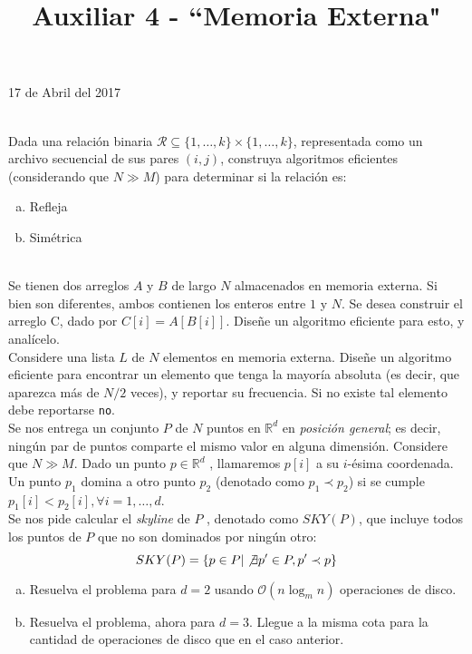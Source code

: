 \documentclass[dcc,uchile]{fcfmcourse}
\title{Auxiliar 4 - ``Memoria Externa"}
\begin{document}
\maketitle
\begin{center}
17 de Abril del 2017
\end{center}
\vspace{-1ex}


\begin{problems}
\\
Dada una relación binaria $\mathcal{R} \subseteq \{1, \ldots, k \} \times \{1, \ldots, k \}$, representada como un archivo secuencial de sus pares $(i, j)$, construya algoritmos eficientes (considerando
que $N \gg M$) para determinar si la relación es:
\begin{enumerate}[a)]
    \item Refleja
    \item Simétrica
\end{enumerate}
\\
Se tienen dos arreglos $A$ y $B$ de largo $N$ almacenados en memoria externa. Si bien son diferentes, ambos contienen los enteros entre $1$ y $N$. Se desea construir el arreglo C, dado por $C[i] = A[B[i]]$. Diseñe un algoritmo eficiente para esto, y analícelo.
\\
Considere una lista $L$ de $N$ elementos en memoria externa. Diseñe un algoritmo eficiente para encontrar un elemento que tenga la mayoría absoluta (es decir, que aparezca más de $N/2$ veces), y reportar su frecuencia. Si no existe tal elemento debe reportarse \texttt{no}.
\\
Se nos entrega un conjunto $P$ de $N$ puntos en $\mathbb{R}^d$ en \textit{posición general}; es decir, ningún par de puntos comparte el mismo valor en alguna dimensión. Considere que $N \gg M$. Dado un punto $p \in \mathbb{R}^d$ , llamaremos $p[i]$ a su $i$-ésima coordenada. Un punto $p_{1}$ domina a otro punto $p_{2}$ (denotado como $p_{1} \prec p_{2}$) si se cumple $p_{1}[i] < p_{2}[i], \forall i = 1, \ldots, d$.\\
Se nos pide calcular el \textit{skyline} de $P$ , denotado como $SKY (P)$, que incluye todos los puntos de $P$ que no son dominados por ningún otro:
\begin{equation*}
SKY(P) = \{p \in P | \not \exists p' \in P, p' \prec p\}    
\end{equation*}
\begin{enumerate}[a)]
\item Resuelva el problema para $d = 2$ usando $\mathcal{O}(n \log_{m} n)$ operaciones de disco.
\item Resuelva el problema, ahora para $d = 3$. Llegue a la misma cota para la cantidad de operaciones de disco que en el caso anterior.
\end{enumerate}
\end{problems}
\end{document}
